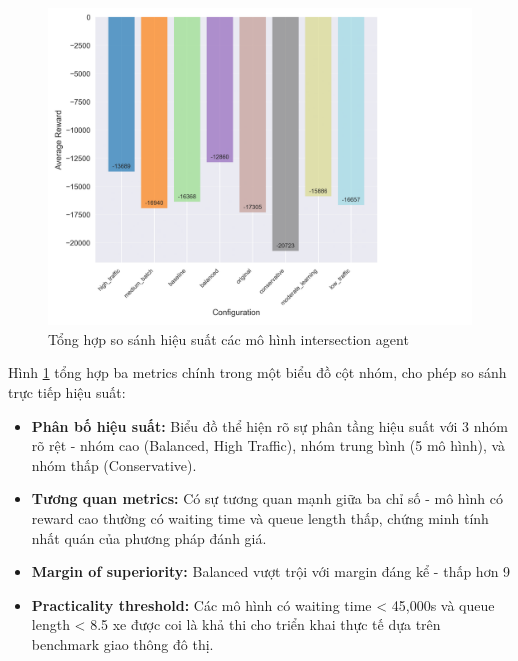 \begin{figure}[!htp]
    \centering
    \includegraphics[width=\textwidth]{
        figures/individual_plots/intersection_filtered_performance_summary.png
    }
    \caption{Tổng hợp so sánh hiệu suất các mô hình intersection agent}
    \label{fig:intersection_filtered_performance_summary}
\end{figure}

Hình \ref{fig:intersection_filtered_performance_summary} tổng hợp ba metrics chính trong một biểu đồ cột nhóm, cho phép so sánh trực tiếp hiệu suất:

\begin{itemize}
    \item \textbf{Phân bố hiệu suất:} Biểu đồ thể hiện rõ sự phân tầng hiệu suất với 3 nhóm rõ rệt - nhóm cao (Balanced, High Traffic), nhóm trung bình (5 mô hình), và nhóm thấp (Conservative).
    
    \item \textbf{Tương quan metrics:} Có sự tương quan mạnh giữa ba chỉ số - mô hình có reward cao thường có waiting time và queue length thấp, chứng minh tính nhất quán của phương pháp đánh giá.
    
    \item \textbf{Margin of superiority:} Balanced vượt trội với margin đáng kể - thấp hơn 9%
    
    \item \textbf{Practicality threshold:} Các mô hình có waiting time < 45,000s và queue length < 8.5 xe được coi là khả thi cho triển khai thực tế dựa trên benchmark giao thông đô thị.
\end{itemize}

